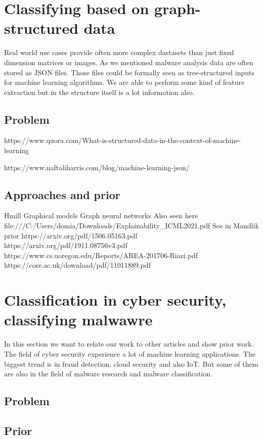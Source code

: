 \section{Classifying based on graph-structured data}
Real world use cases provide often more complex dastasets than just fixed dimension matrices or images. As we mentioned malware analysis data are often stored as JSON files. Those files could be formally seen as tree-structured inputs for machine learning algorithms. We are able to perform some kind of feature extraction but in the structure itself is a lot information also. 
\subsection{Problem}
https://www.quora.com/What-is-structured-data-in-the-context-of-machine-learning

https://www.naftaliharris.com/blog/machine-learning-json/

\subsection{Approaches and prior}
Hmill
Graphical models
Graph neural networks
    Also seen here file:///C:/Users/domia/Downloads/Explainability_ICML2021.pdf
See in Mandlik
prior
    https://arxiv.org/pdf/1506.05163.pdf
    https://arxiv.org/pdf/1911.08756v3.pdf
    https://www.cs.uoregon.edu/Reports/AREA-201706-Riazi.pdf
    https://core.ac.uk/download/pdf/11011889.pdf


\section{Classification in cyber security, classifying malwawre} %
In this section we want to relate our work to other articles and show prior work. The field of cyber security experience a lot of machine learning applications. The biggest trend is in fraud detection, cloud security and also IoT. But some of them are also in the field of malware research and malware classification.



\subsection{Problem}
\subsection{Prior}

